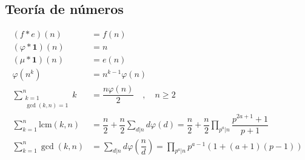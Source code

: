 \documentclass[11pt]{article}
\begin{document}
		\subsection{Teoría de números}
			\begin{align*}
				(f * e)(n) &= f(n) \\
				(\varphi * \mathbf{1})(n) &= n \\
				(\mu * \mathbf{1})(n) &= e(n) \\
				\varphi(n^k) &= n^{k-1}\varphi(n) \\
				\sum_{\substack{k=1	\\ \gcd(k,n)=1}}^{n} k &= \dfrac{n \varphi(n)}{2} \quad , \quad n \geq 2 \\
				\sum_{k=1}^{n} \text{lcm}(k,n) &= \dfrac{n}{2} + \dfrac{n}{2}\sum_{d | n} d\varphi(d) = \dfrac{n}{2} + \dfrac{n}{2} \prod_{p^a | n} \dfrac{p^{2a+1}+1}{p+1} \\
				\sum_{k=1}^{n} \gcd(k,n) &= \sum_{d | n} d\varphi\left(\dfrac{n}{d}\right) = \prod_{p^a | n} p^{a-1}(1+(a+1)(p-1))
			\end{align*}
		
\end{document}
